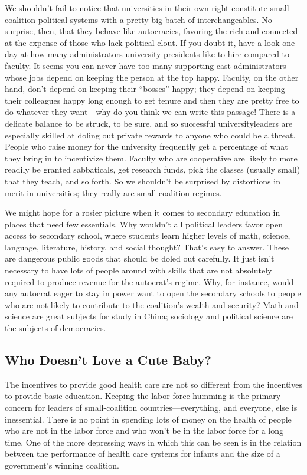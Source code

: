 \documentclass[10pt]{article}
\begin{document}
{\large We shouldn't fail to notice that universities in their own right
constitute small-coalition political systems with a pretty big batch of
interchangeables. No surprise, then, that they behave like autocracies, favoring
the rich and connected at the expense of those who lack political clout. If you
doubt it, have a look one day at how many administrators university presidents
like to hire compared to faculty. It seems you can never have too many
supporting-cast administrators whose jobs depend on keeping the person at the top
happy. Faculty, on the other hand, don't depend on keeping their ``bosses''
happy; they depend on keeping their colleagues happy long enough to get tenure
and then they are pretty free to do whatever they want---why do you think we can
write this passage! There is a delicate balance to be struck, to be sure, and so
successful universityleaders are especially skilled at doling out private rewards
to anyone who could be a threat. People who raise money for the university
frequently get a percentage of what they bring in to incentivize them. Faculty
who are cooperative are likely to more readily be granted sabbaticals, get
research funds, pick the classes (usually small) that they teach, and so forth.
So we shouldn't be surprised by distortions in merit in universities; they really
are small-coalition regimes.}

{\large We might hope for a rosier picture when it comes to secondary education
in places that need few essentials. Why wouldn't all political leaders favor open
access to secondary school, where students learn higher levels of math, science,
language, literature, history, and social thought? That's easy to answer. These
are dangerous public goods that should be doled out carefully. It just isn't
necessary to have lots of people around with skills that are not absolutely
required to produce revenue for the autocrat's regime. Why, for instance, would
any autocrat eager to stay in power want to open the secondary schools to people
who are not likely to contribute to the coalition's wealth and security? Math and
science are great subjects for study in China; sociology and political science
are the subjects of democracies.}

\subsection{Who Doesn't Love a Cute Baby?}

{\large The incentives to provide good health care are not so different from the
incentives to provide basic education. Keeping the labor force humming is the
primary concern for leaders of small-coalition countries---everything, and
everyone, else is inessential. There is no point in spending lots of money on the
health of people who are not in the labor force and who won't be in the labor
force for a long time. One of the more depressing ways in which this can be seen
is in the relation between the performance of health care systems for infants and
the size of a government's winning coalition.}
\end{document}
